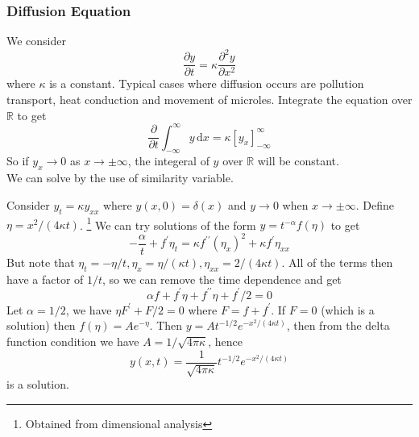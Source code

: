 \subsubsection{Diffusion Equation}
We consider
$$\frac{\partial y}{\partial t}=\kappa\frac{\partial^2 y}{\partial x^2}$$
where $\kappa$ is a constant.
Typical cases where diffusion occurs are pollution transport, heat conduction and movement of microles.
Integrate the equation over $\mathbb R$ to get
$$\frac{\partial}{\partial t}\int_{-\infty}^\infty y\,\mathrm dx=\kappa [y_x]^\infty_{-\infty}$$
So if $y_x\to 0$ as $x\to\pm\infty$, the integeral of $y$ over $\mathbb R$ will be constant.\\
We can solve by the use of similarity variable.
\begin{example}
    Consider $y_t=\kappa y_{xx}$ where $y(x,0)=\delta (x)$ and $y\to 0$ when $x\to\pm\infty$.
    Define $\eta=x^2/(4\kappa t)$.
    \footnote{Obtained from dimensional analysis}
    We can try solutions of the form $y=t^{-\alpha}f(\eta)$ to get
    $$-\frac{\alpha}{t}+f^\prime\eta_t=\kappa f^{\prime\prime}(\eta_x)^2+\kappa f^\prime\eta_{xx}$$
    But note that $\eta_t=-\eta/t,\eta_x=\eta/(\kappa t),\eta_{xx}=2/(4\kappa t)$.
    All of the terms then have a factor of $1/t$, so we can remove the time dependence and get
    $$\alpha f+f^\prime \eta+f^{\prime\prime}\eta+f^\prime/2=0$$
    Let $\alpha=1/2$, we have $\eta F^\prime+F/2=0$ where $F=f+f^\prime$.
    If $F=0$ (which is a solution) then $f(\eta)=Ae^{-\eta}$.
    Then $y=At^{-1/2}e^{-x^2/(4\kappa t)}$, then from the delta function condition we have $A=1/\sqrt{4\pi\kappa}$, hence
    $$y(x,t)=\frac{1}{\sqrt{4\pi\kappa}}t^{-1/2}e^{-x^2/(4\kappa t)}$$
    is a solution.
\end{example}
